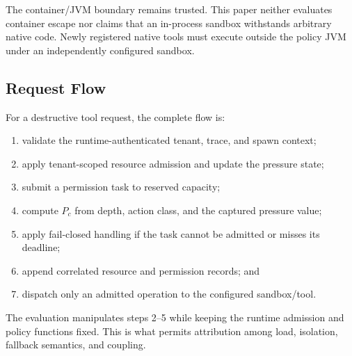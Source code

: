 \label{sec:arch-sandbox}
The container/JVM boundary remains trusted. This paper neither evaluates
container escape nor claims that an in-process sandbox withstands arbitrary
native code. Newly registered native tools must execute outside the policy
JVM under an independently configured sandbox.

\subsection{Request Flow}

For a destructive tool request, the complete flow is:

\begin{enumerate}
  \item validate the runtime-authenticated tenant, trace, and spawn context;
  \item apply tenant-scoped resource admission and update the pressure state;
  \item submit a permission task to reserved capacity;
  \item compute $P_c$ from depth, action class, and the captured pressure
  value;
  \item apply fail-closed handling if the task cannot be admitted or misses
  its deadline;
  \item append correlated resource and permission records; and
  \item dispatch only an admitted operation to the configured sandbox/tool.
\end{enumerate}

The evaluation manipulates steps 2--5 while keeping the runtime admission
and policy functions fixed. This is what permits attribution among load,
isolation, fallback semantics, and coupling.
